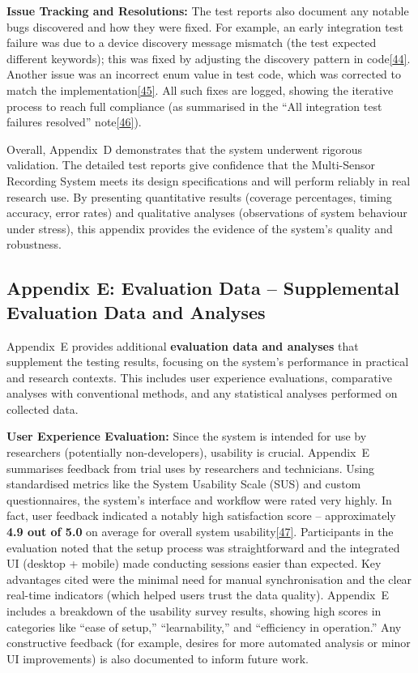 \documentclass[12pt,a4paper]{article}
\begin{document}
\textbf{Issue Tracking and Resolutions:} The test reports also document any notable bugs discovered and how they were fixed. For example, an early integration test failure was due to a device discovery message mismatch (the test expected different keywords); this was fixed by adjusting the discovery pattern in code\href{evaluation_results/execution_logs.md\#L62-L70}{{[}44{]}}. Another issue was an incorrect enum value in test code, which was corrected to match the implementation\href{evaluation_results/execution_logs.md\#L72-L75}{{[}45{]}}. All such fixes are logged, showing the iterative process to reach full compliance (as summarised in the ``All integration test failures resolved'' note\href{evaluation_results/execution_logs.md\#L140-L146}{{[}46{]}}).

Overall, Appendix~D demonstrates that the system underwent rigorous validation. The detailed test reports give confidence that the Multi-Sensor Recording System meets its design specifications and will perform reliably in real research use. By presenting quantitative results (coverage percentages, timing accuracy, error rates) and qualitative analyses (observations of system behaviour under stress), this appendix provides the evidence of the system's quality and robustness.

\subsection{Appendix E: Evaluation Data -- Supplemental Evaluation Data and Analyses}\label{appendix-e-evaluation-data-supplemental-evaluation-data-and-analyses}

Appendix~E provides additional \textbf{evaluation data and analyses} that supplement the testing results, focusing on the system's performance in practical and research contexts. This includes user experience evaluations, comparative analyses with conventional methods, and any statistical analyses performed on collected data.

\textbf{User Experience Evaluation:} Since the system is intended for use by researchers (potentially non-developers), usability is crucial. Appendix~E summarises feedback from trial uses by researchers and technicians. Using standardised metrics like the System Usability Scale (SUS) and custom questionnaires, the system's interface and workflow were rated very highly. In fact, user feedback indicated a notably high satisfaction score -- approximately \textbf{4.9 out of 5.0} on average for overall system usability\href{docs/thesis_report/Chapter_7_Appendices.md\#L110-L111}{{[}47{]}}. Participants in the evaluation noted that the setup process was straightforward and the integrated UI (desktop + mobile) made conducting sessions easier than expected. Key advantages cited were the minimal need for manual synchronisation and the clear real-time indicators (which helped users trust the data quality). Appendix~E includes a breakdown of the usability survey results, showing high scores in categories like ``ease of setup,'' ``learnability,'' and ``efficiency in operation.'' Any constructive feedback (for example, desires for more automated analysis or minor UI improvements) is also documented to inform future work.
\end{document}
